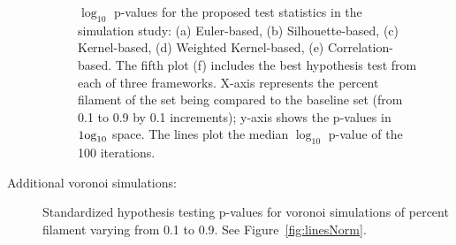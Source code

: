 \documentclass[12pt]{article}
\newcommand{\figref}[1]{Figure~\ref{#1}}
\begin{document}
\begin{description}
\begin{figure}[htp!]
    \caption{$\log_{10}$ p-values for the proposed test statistics in the simulation study: (a) Euler-based, (b) Silhouette-based, (c) Kernel-based, (d) Weighted Kernel-based, (e) Correlation-based. The fifth plot (f) includes the best hypothesis test from each of three frameworks. X-axis represents the percent filament of the set being compared to the baseline set (from 0.1 to 0.9 by 0.1 increments); y-axis shows the p-values in $\textup{1og}_{10}$ space. The lines plot the median $\log_{10}$ p-value of the 100 iterations. }
    \label{fig:linesUnnorm}
\end{figure}

\item[Additional voronoi simulations:] Standardized hypothesis testing p-values for voronoi simulations of percent filament varying from 0.1 to 0.9. See \figref{fig:linesNorm}.


\end{description}
\end{document}
